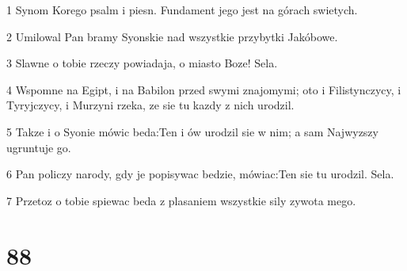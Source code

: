 \par 1 Synom Korego psalm i piesn. Fundament jego jest na górach swietych.
\par 2 Umilowal Pan bramy Syonskie nad wszystkie przybytki Jakóbowe.
\par 3 Slawne o tobie rzeczy powiadaja, o miasto Boze! Sela.
\par 4 Wspomne na Egipt, i na Babilon przed swymi znajomymi; oto i Filistynczycy, i Tyryjczycy, i Murzyni rzeka, ze sie tu kazdy z nich urodzil.
\par 5 Takze i o Syonie mówic beda:Ten i ów urodzil sie w nim; a sam Najwyzszy ugruntuje go.
\par 6 Pan policzy narody, gdy je popisywac bedzie, mówiac:Ten sie tu urodzil. Sela.
\par 7 Przetoz o tobie spiewac beda z plasaniem wszystkie sily zywota mego.

\chapter{88}

